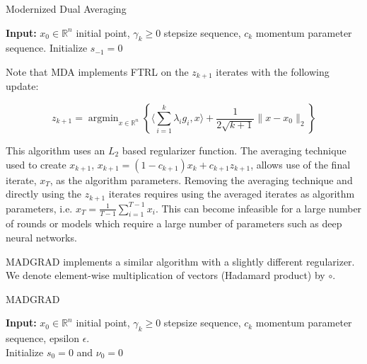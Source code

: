 \documentclass{article}
\newcommand{\R}{\mathbb{R}}
\newcommand{\argmin}{\mathop{\text{argmin}}}
\begin{document}
\begin{algorithm}
  \caption{Modernized Dual Averaging}\label{algo:mda}
  \textbf{Input:} $x_0 \in \R^n$ initial point, $\gamma_k \geq 0$ stepsize sequence, $c_k$ momentum parameter
  sequence. Initialize $s_{-1} = 0$ \\
\end{algorithm}

Note that MDA implements FTRL on the $z_{k+1}$ iterates with the following update:

\[
  z_{k+1} = \argmin_{x \in \R^n}\left\{\langle \sum\limits_{i=1}^{k}\lambda_i g_i, x \rangle + \frac{1}{2\sqrt{k+1}}\|x
  - x_0\|_2\right\}
\]

This algorithm uses an $L_2$ based regularizer function. The averaging technique used to create $x_{k+1}$, $x_{k+1} = (1
- c_{k+1})x_k + c_{k+1}z_{k+1}$, allows use of the final iterate, $x_T$, as the algorithm parameters. Removing the
averaging technique and directly using the $z_{k+1}$ iterates requires using the averaged iterates as algorithm
parameters, i.e. $x_T = \frac{1}{T-1}\sum_{i=1}^{T-1} x_i$. This can become infeasible for a large number of rounds or
models which require a large number of parameters such as deep neural networks.

MADGRAD implements a similar algorithm with a slightly different regularizer. We denote element-wise multiplication of
vectors (Hadamard product) by $\circ$.

\begin{algorithm}
  \caption{MADGRAD}\label{algo:madgrad}
  \textbf{Input:} $x_0 \in \R^n$ initial point, $\gamma_k \geq 0$ stepsize sequence, $c_k$ momentum parameter
  sequence, epsilon $\epsilon$. \\
  Initialize $s_0= 0$ and $\nu_0 = 0$ \\
\end{algorithm}
\end{document}
